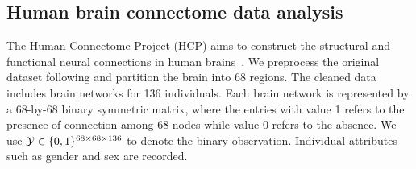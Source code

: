 \documentclass[lettersize,onecolumn,journal]{IEEEtran}
\theoremstyle{definition}
\theoremstyle{definition}
\begin{document}



\subsection{Human brain connectome data analysis}

The Human Connectome Project (HCP) aims to construct the structural and functional neural connections in human brains~\citep{van2013wu}. We preprocess the original dataset following \cite{desikan2006automated} and partition the brain into 68 regions. The cleaned data includes brain networks for 136 individuals. Each brain network is represented by a 68-by-68 binary symmetric matrix, where the entries with value 1 refers to the presence of connection among 68 nodes while value 0 refers to the absence. We use $\mathcal{Y} \in \{0,1\}^{68 \times 68 \times 136}$ to denote the binary observation. Individual attributes such as gender and sex are recorded.
\end{document}
